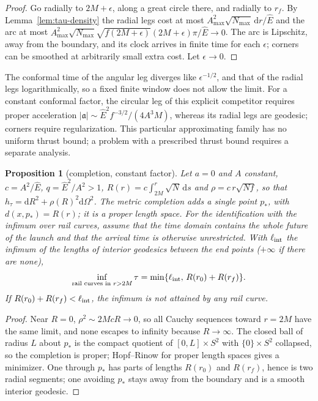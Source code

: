 \documentclass[aip,jmp,amsmath,amssymb,reprint]{revtex4-2}
\newcommand{\Ehat}{\hat E}
\newcommand{\dd}{\mathrm{d}}
\theoremstyle{plain}
\newtheorem{proposition}{Proposition}[section]
\theoremstyle{definition}
\begin{document}
\begin{proof}
Go radially to $2M+\epsilon$, along a great circle there, and radially to $r_f$. By
Lemma~\ref{lem:tau-density} the radial legs cost at most
$A_{\max}^2\sqrt{N_{\max}}\,\dd r/\Ehat$ and the arc at most
$A_{\max}^2\sqrt{N_{\max}}\sqrt{f(2M+\epsilon)}(2M+\epsilon)\pi/\Ehat\to0$. The arc is Lipschitz,
away from the boundary, and its clock arrives in finite time for each $\epsilon$; corners
can be smoothed at arbitrarily small extra cost. Let $\epsilon\to0$.
\end{proof}

The conformal time of the angular leg diverges like $\epsilon^{-1/2}$, and that of the radial
legs logarithmically, so a fixed finite window does not allow the limit. For a constant
conformal factor, the circular leg of this explicit competitor requires proper acceleration
$|\mathfrak a|\sim\Ehat^2f^{-3/2}/(4A^3M)$, whereas its radial legs are geodesic; corners
require regularization. This particular approximating family has no uniform thrust bound; a
problem with a prescribed thrust bound requires a separate analysis.

\begin{proposition}[completion, constant factor]\label{prop:completion}
Let $a=0$ and $A$ constant, $c=A^2/\Ehat$, $q=\Ehat^2/A^2>1$,
$R(r)=c\int_{2M}^r\sqrt{N}\,\dd s$ and $\rho=c\,r\sqrt{Nf}$, so that $h_\tau=\dd R^2+\rho(R)^2\dd\Omega^2$.
The metric completion adds a single point $p_*$, with $d(x,p_*)=R(r)$; it is a proper
length space. For the identification with the infimum over rail curves, assume that the time
domain contains the whole future of the launch and that the arrival time is otherwise
unrestricted. With $\ell_{\rm int}$ the infimum of the lengths of interior geodesics between
the end points ($+\infty$ if there are none),
\[
  \inf_{\text{rail curves in }r>2M}\tau=\min\{\ell_{\rm int},\,R(r_0)+R(r_f)\}.
\]
If $R(r_0)+R(r_f)<\ell_{\rm int}$, the infimum is not attained by any rail curve.
\end{proposition}

\begin{proof}
Near $R=0$, $\rho^2\sim2McR\to0$, so all Cauchy sequences toward $r=2M$ have the same limit,
and none escapes to infinity because $R\to\infty$. The closed ball of radius $L$ about $p_*$
is the compact quotient of $[0,L]\times S^2$ with $\{0\}\times S^2$ collapsed, so the
completion is proper; Hopf--Rinow for proper length spaces gives a minimizer. One through
$p_*$ has parts of lengths $R(r_0)$ and $R(r_f)$, hence is two radial segments; one avoiding
$p_*$ stays away from the boundary and is a smooth interior geodesic.
\end{proof}
\end{document}
